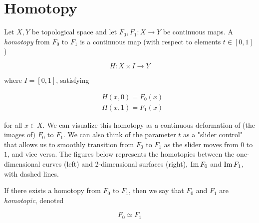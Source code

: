 \section{Homotopy}

  \begin{definition}
    Let $X, Y$ be topological space and let $F_0, F_1: X \longrightarrow Y$ be continuous maps. A \textit{homotopy} from $F_0$ to $F_1$ is a continuous map (with respect to elements $t \in [0,1]$)

      \[H: X \times I \longrightarrow Y\]

    where $I = [0,1]$, satisfying

    \begin{align*}
      & H(x, 0) = F_0 (x) \\
      & H(x, 1) = F_1 (x) 
    \end{align*}

    for all $x \in X$. We can visualize this homotopy as a continuous deformation of (the images of) $F_0$ to $F_1$. We can also think of the parameter $t$ as a "slider control" that allows us to smoothly transition from $F_0$ to $F_1$ as the slider moves from $0$ to $1$, and vice versa. The figures below represents the homotopies between the one-dimensional curves (left) and 2-dimensional surfaces (right), $\operatorname{Im}{F_0}$ and $\operatorname{Im}{F_1}$, with dashed lines. 

    \begin{center}
    \end{center}

    If there exists a homotopy from $F_0$ to $F_1$, then we say that $F_0$ and $F_1$ are \textit{homotopic}, denoted

    \[F_0 \simeq F_1\]
  \end{definition}

